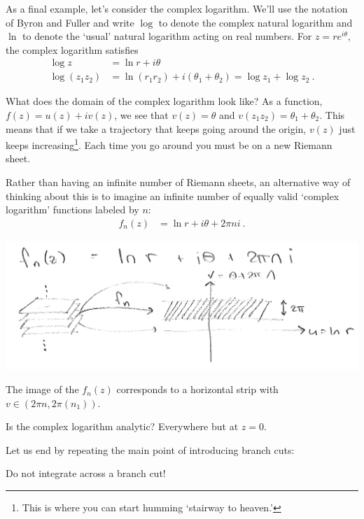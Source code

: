 As a final example, let's consider the complex logarithm. We'll use the notation of Byron and Fuller and write $\log$ to denote the complex natural logarithm and $\ln$ to denote the `usual' natural logarithm acting on real numbers. For $z=r e^{i\theta}$, the complex logarithm satisfies
\begin{align}
  \log z &= \ln r + i \theta
  \\
  \log(z_1z_2)
  &=\ln(r_1r_2) + i (\theta_1+\theta_2)
  = \log z_1 + \log z_2 \ .
\end{align}
\begin{example}
What does the domain of the complex logarithm look like? As a function, $f(z) = u(z) + i v(z)$, we see that $v(z) = \theta$ and $v(z_1z_2)=\theta_1+\theta_2$. This means that if we take a trajectory that keeps going around the origin, $v(z)$ just keeps increasing\footnote{This is where you can start humming `stairway to heaven.'}. Each time you go around you must be on a new Riemann sheet. 
\end{example}
Rather than having an infinite number of Riemann sheets, an alternative way of thinking about this is to imagine an infinite number of equally valid `complex logarithm' functions labeled by $n$:
\begin{align}
  f_n(z) &= \ln r + i \theta + 2\pi n i \ .
\end{align}
\begin{center}
\includegraphics[width=\textwidth]{figures/lec13_map5.png}
\end{center}
The image of the $f_n(z)$ corresponds to a horizontal strip with $v\in \left(2\pi n, 2\pi(n_1)\right)$.
\begin{example}
Is the complex logarithm analytic? Everywhere but at $z=0$.
\end{example}
Let us end by repeating the main point of introducing branch cuts:
\begin{center}
Do not integrate across a branch cut!
\end{center}


